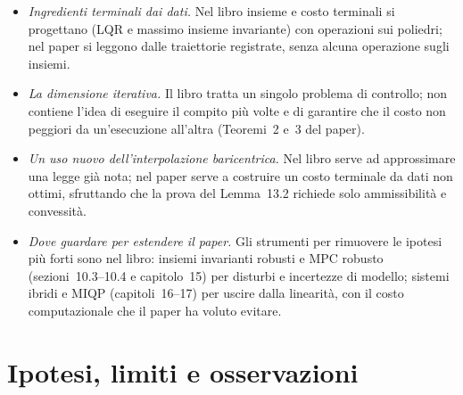 \documentclass[11pt,a4paper]{article}
\theoremstyle{definition}
\theoremstyle{plain}
\theoremstyle{remark}
\begin{document}
\begin{itemize}
  \item \emph{Ingredienti terminali dai dati.} Nel libro insieme e costo
        terminali si progettano (LQR e massimo insieme invariante) con
        operazioni sui poliedri; nel paper si leggono dalle traiettorie
        registrate, senza alcuna operazione sugli insiemi.
  \item \emph{La dimensione iterativa.} Il libro tratta un singolo problema
        di controllo; non contiene l'idea di eseguire il compito più volte e
        di garantire che il costo non peggiori da un'esecuzione all'altra
        (Teoremi~2 e~3 del paper).
  \item \emph{Un uso nuovo dell'interpolazione baricentrica.} Nel libro
        serve ad approssimare una legge già nota; nel paper serve a costruire
        un costo terminale da dati non ottimi, sfruttando che la prova del
        Lemma~13.2 richiede solo ammissibilità e convessità.
  \item \emph{Dove guardare per estendere il paper.} Gli strumenti per
        rimuovere le ipotesi più forti sono nel libro: insiemi invarianti
        robusti e MPC robusto (sezioni~10.3--10.4 e capitolo~15) per
        disturbi e incertezze di modello; sistemi ibridi e MIQP
        (capitoli~16--17) per uscire dalla linearità, con il costo
        computazionale che il paper ha voluto evitare.
\end{itemize}

\section{Ipotesi, limiti e osservazioni}\label{sec:limiti}
\end{document}
